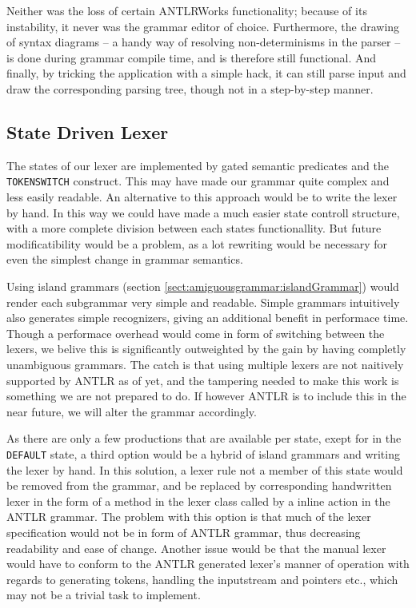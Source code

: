 Neither was the loss of certain ANTLRWorks functionality; because of its
instability, it never was the grammar editor of choice. Furthermore, the
drawing of syntax diagrams -- a handy way of resolving non-determinisms in the
parser -- is done during grammar compile time, and is therefore still
functional. And finally, by tricking the application with a simple hack, it can
still parse input and draw the corresponding parsing tree, though not in a
step-by-step manner.

\subsection{State Driven Lexer}
\label{sect:discussion:stateDriven}
The states of our lexer are implemented by gated semantic predicates and the
\verb!TOKENSWITCH! construct. This may have made our grammar quite complex and
less easily readable. An alternative to this approach would be to write the
lexer by hand. In this way we could have made a much easier state controll
structure, with a more complete division between each states functionallity.
But future modificatibility would be a problem, as a lot rewriting would be
necessary for even the simplest change in grammar semantics.

Using island grammars (section \ref{sect:amiguousgrammar:islandGrammar}) would render each subgrammar very simple and readable. Simple grammars intuitively also generates simple recognizers, giving an additional benefit in performace time. Though a performace overhead would come in form of switching between the lexers, we belive this is significantly outweighted by the gain by having completly unambiguous grammars. The catch is that using multiple lexers are not naitively supported by ANTLR as of yet, and the tampering needed to make this work is something we are not prepared to do. If however ANTLR is to include this in the near future, we will alter the grammar accordingly.

As there are only a few productions that are available per state, exept for in the \verb!DEFAULT! state, a third option would be a hybrid of island grammars and writing the lexer by hand. In this solution, a lexer rule not a member of this state would be removed from the grammar, and be replaced by corresponding handwritten lexer in the form of a method in the lexer class called by a inline action in the ANTLR grammar. The problem with this option is that much of the lexer specification would not be in form of ANTLR grammar, thus decreasing readability and ease of change. Another issue would be that the manual lexer would have to conform to the ANTLR generated lexer's manner of operation with regards to generating tokens, handling the inputstream and pointers etc., which may not be a trivial task to implement.